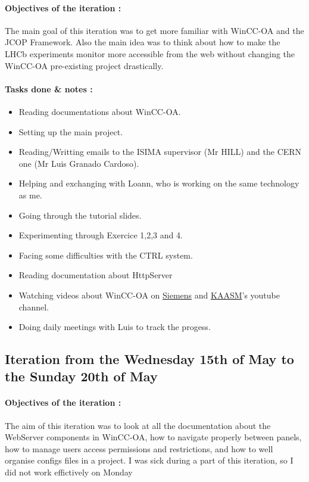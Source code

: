 \documentclass[a4paper, 12pt]{article}
\begin{document}
\paragraph{Objectives of the iteration :} 
The main goal of this iteration was to get more familiar with WinCC-OA and the JCOP Framework. 
Also the main idea was to think about how to make the LHCb experiments monitor more accessible from the web without changing the WinCC-OA pre-existing project drastically.
\paragraph{Tasks done \& notes :}
\begin{itemize}
    \item Reading documentations about WinCC-OA.
    \item Setting up the main project.
    \item Reading/Writting emails to the ISIMA supervisor (Mr HILL) and the CERN one (Mr Luis Granado Cardoso).
    \item Helping and exchanging with Loann, who is working on the same technology as me.
    \item Going through the tutorial slides.
    \item Experimenting through Exercice 1,2,3 and 4.
    \item Facing some difficulties with the CTRL system.
    \item Reading documentation about HttpServer
    \item Watching videos about WinCC-OA on \href{https://www.youtube.com/user/ETM2011}{Siemens} and \href{https://www.youtube.com/channel/UCGBnHd1-B-Zg9MDsjTk0-Sw}{KAASM}'s youtube channel. 
    \item Doing daily meetings with Luis to track the progess.
\end{itemize}

\subsection{Iteration from the Wednesday 15th of May to the Sunday 20th of May}
\paragraph{Objectives of the iteration :}
The aim of this iteration was to look at all the documentation about the WebServer components in WinCC-OA, how to navigate properly between panels, how to manage users access permissions and restrictions, and how to well organise configs files in a project. I was sick during a part of this iteration, so I did not work effictively on Monday
\end{document}
